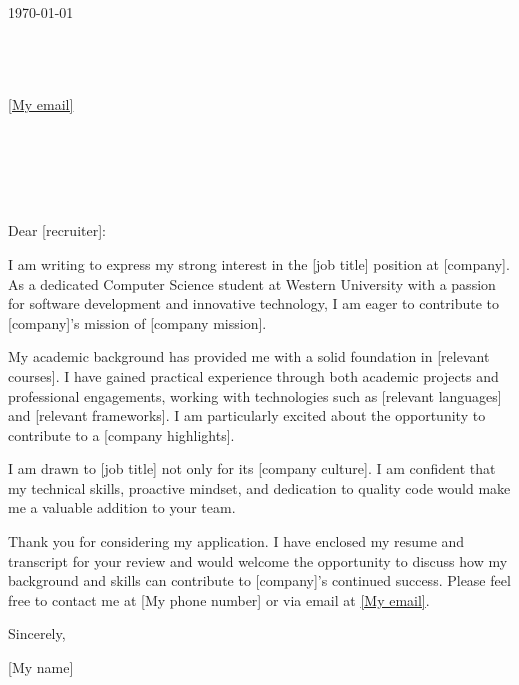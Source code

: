 \documentclass[11pt]{article}
\begin{document}
\begin{flushright}
\today
\end{flushright}

\noindent [My name]\\
[My location (do NOT add this line if not provided)] \\
[My phone] \\
\href{mailto:[My email]}{[My email]} \\

\vspace{1em}

\noindent [company] \\
[recruiter position (do not add this line if none are provided)] \\
[recruiter (if none provided, put Hiring Manager)] \\
[company location (do not add this line if none are provided)] \\

\vspace{1em}

\noindent Dear [recruiter]:

\setlength{\parindent}{15pt}
\setlength{\parskip}{0.75em}

I am writing to express my strong interest in the [job title] position at [company]. As a dedicated Computer Science student at Western University with a passion for software development and innovative technology, I am eager to contribute to [company]’s mission of [company mission].

My academic background has provided me with a solid foundation in [relevant courses]. I have gained practical experience through both academic projects and professional engagements, working with technologies such as [relevant languages] and [relevant frameworks]. I am particularly excited about the opportunity to contribute to a [company highlights].

I am drawn to [job title] not only for its [company culture]. I am confident that my technical skills, proactive mindset, and dedication to quality code would make me a valuable addition to your team.

Thank you for considering my application. I have enclosed my resume and transcript for your review and would welcome the opportunity to discuss how my background and skills can contribute to [company]’s continued success. Please feel free to contact me at [My phone number] or via email at \href{[My email]}{[My email]}.

\setlength{\parindent}{0pt}

\vspace{1em}
Sincerely,

\vspace{1em}
[My name]
\end{document}
